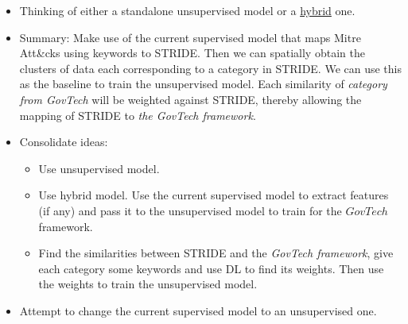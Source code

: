 \begin{itemize}
    \item Thinking of either a standalone unsupervised model or a \href{https://journalofbigdata.springeropen.com/articles/10.1186/s40537-022-00636-w}{hybrid} one.
    \item Summary: Make use of the current supervised model that maps Mitre Att\&cks using keywords to STRIDE. Then we can spatially obtain the clusters of data each corresponding to a category in STRIDE. We can use this as the baseline to train the unsupervised model. Each similarity of \textit{category from GovTech} will be weighted against STRIDE, thereby allowing the mapping of STRIDE to \textit{the GovTech framework}.
    \item Consolidate ideas:
        \begin{itemize}
            \item Use unsupervised model.
            \item Use hybrid model. Use the current supervised model to extract features (if any) and pass it to the unsupervised model to train for the $GovTech$ framework.
            \item Find the similarities between STRIDE and the \textit{GovTech framework}, give each category some keywords and use DL to find its weights. Then use the weights to train the unsupervised model.
        \end{itemize}
    \item Attempt to change the current supervised model to an unsupervised one.
\end{itemize}